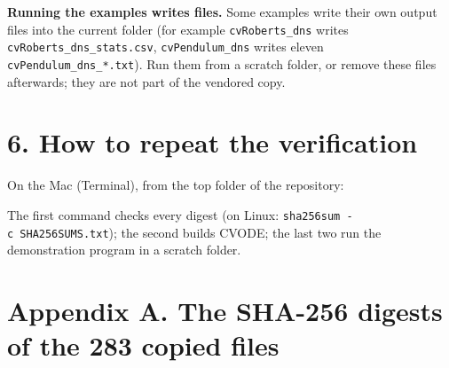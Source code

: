 \documentclass[
  10pt,
]{article}
\newenvironment{Shaded}{}{}
\newcommand{\AttributeTok}[1]{\textcolor[rgb]{0.49,0.56,0.16}{#1}}
\newcommand{\BuiltInTok}[1]{\textcolor[rgb]{0.00,0.50,0.00}{#1}}
\newcommand{\CommentTok}[1]{\textcolor[rgb]{0.38,0.63,0.69}{\textit{#1}}}
\newcommand{\ExtensionTok}[1]{#1}
\newcommand{\FunctionTok}[1]{\textcolor[rgb]{0.02,0.16,0.49}{#1}}
\newcommand{\KeywordTok}[1]{\textcolor[rgb]{0.00,0.44,0.13}{\textbf{#1}}}
\newcommand{\NormalTok}[1]{#1}
\newcommand{\StringTok}[1]{\textcolor[rgb]{0.25,0.44,0.63}{#1}}
\begin{document}
\textbf{Running the examples writes files.} Some examples write their
own output files into the current folder (for example
\texttt{cvRoberts\_dns} writes \texttt{cvRoberts\_dns\_stats.csv},
\texttt{cvPendulum\_dns} writes eleven \texttt{cvPendulum\_dns\_*.txt}).
Run them from a scratch folder, or remove these files afterwards; they
are not part of the vendored copy.

\hypertarget{how-to-repeat-the-verification}{%
\section{6. How to repeat the
verification}\label{how-to-repeat-the-verification}}

On the Mac (Terminal), from the top folder of the repository:

\begin{Shaded}
\end{Shaded}

The first command checks every digest (on Linux:
\texttt{sha256sum\ -c\ SHA256SUMS.txt}); the second builds CVODE; the
last two run the demonstration program in a scratch folder.

\hypertarget{appendix-a.-the-sha-256-digests-of-the-283-copied-files}{%
\section{Appendix A. The SHA-256 digests of the 283 copied
files}\label{appendix-a.-the-sha-256-digests-of-the-283-copied-files}}
\end{document}
